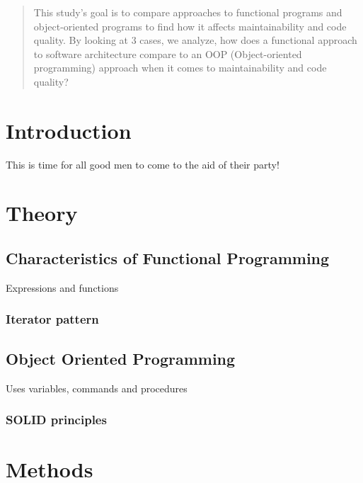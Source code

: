\documentclass[12pt]{article}
\theoremstyle{definition}
\theoremstyle{theorem}
\begin{document}
\maketitle

\begin{abstract} 

    This study's goal is to compare approaches to functional programs and
    object-oriented programs to find how it affects maintainability and code
    quality.  By looking at 3 cases, we analyze, how does a functional approach
    to software architecture compare to an OOP (Object-oriented programming)
    approach when it comes to maintainability and code quality?

\end{abstract}

\section{Introduction}
This is time for all good men to come to the aid of their party!


\section{Theory}\label{theory}

\subsection{Characteristics of Functional Programming}
Expressions and functions

\subsubsection{Iterator pattern}

\subsection{Object Oriented Programming}\label{oop}
Uses variables, commands and procedures

\subsubsection{SOLID principles}

\section{Methods}\label{methods}
\end{document}
